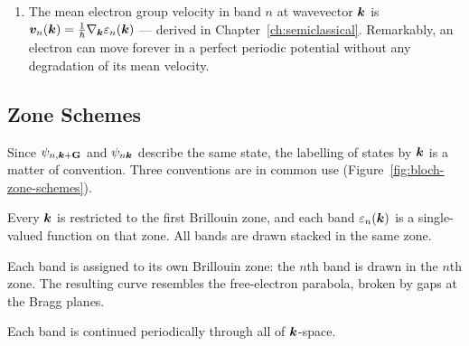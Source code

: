 \begin{enumerate}
    Because $u_{n\lvect{k}}$ is periodic, \eqref{eq:bloch-hamiltonian} may be solved on a single Wigner--Seitz cell with periodic boundary conditions. A problem on a finite volume has a discrete spectrum, which is why the eigenvalues at fixed $\lvect{k}$ are labelled by a discrete band index $n$. Since $\lvect{k}$ enters $\hat{H}_{\lvect{k}}$ only as a parameter, each level varies continuously with $\lvect{k}$, producing a family of continuous functions $\varepsilon_n(\lvect{k})$ with the periodicity
    \begin{equation}
        \psi_{n,\lvect{k}+\cvect{G}} = \psi_{n\lvect{k}}(\lvect{x}), \qquad \varepsilon_{n,\lvect{k}+\cvect{G}} = \varepsilon_{n,\lvect{k}}.
    \end{equation}
    \item The mean electron group velocity in band $n$ at wavevector $\lvect{k}$ is $\bm{v}_n(\bm{k}) = \frac{1}{\hbar}\nabla_{\bm{k}}\varepsilon_n(\bm{k})$ --- derived in Chapter~\ref{ch:semiclassical}. Remarkably, an electron can move forever in a perfect periodic potential without any degradation of its mean velocity.
\end{enumerate}

\subsection{Zone Schemes}

Since $\psi_{n,\lvect{k}+\cvect{G}}$ and $\psi_{n\bm{k}}$ describe the same state, the labelling of states by $\lvect{k}$ is a matter of convention. Three conventions are in common use (Figure~\ref{fig:bloch-zone-schemes}).

\begin{definition}
Every $\lvect{k}$ is restricted to the first Brillouin zone, and each band $\varepsilon_n(\lvect{k})$ is a single-valued function on that zone. All bands are drawn stacked in the same zone.
\end{definition}

\begin{definition}
Each band is assigned to its own Brillouin zone: the $n$th band is drawn in the $n$th zone. The resulting curve resembles the free-electron parabola, broken by gaps at the Bragg planes.
\end{definition}

\begin{definition}
Each band is continued periodically through all of $\lvect{k}$-space.
\end{definition}

